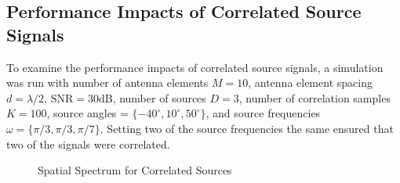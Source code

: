 \documentclass[conference]{IEEEtran}
\begin{document}
		\subsection{Performance Impacts of Correlated Source Signals}
		
		To examine the performance impacts of correlated source signals, a simulation was run with number of antenna elements $M=10$, antenna element spacing $d = \lambda/2$, $\text{SNR}=30\text{dB}$, number of sources $D=3$, number of correlation samples $K=100$, source angles = $\{-40^{\circ}, 10^{\circ}, 50^{\circ}\}$, and source frequencies $\omega = \{\pi/3, \pi/3, \pi/7\}$. Setting two of the source frequencies the same ensured that two of the signals were correlated.
		
		\begin{figure}
			\centerline{}
			\caption{Spatial Spectrum for Correlated Sources}
			\label{fig::correlated_signals}
		\end{figure}
		
\end{document}
